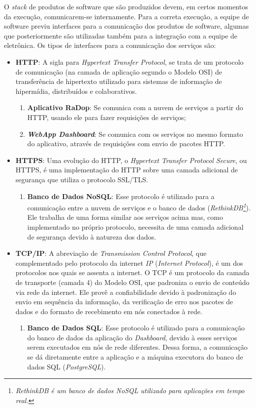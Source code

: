 O \textit{stack} de produtos de software que são produzidos devem, em certos momentos da execução, comunicarem-se internamente. Para a correta execução, a equipe de software previu interfaces para a comunicação dos produtos de software, algumas que posteriormente são utilizadas também para a integração com a equipe de eletrônica.
Os tipos de interfaces para a comunicação dos serviços são:
\begin{itemize}
    \item \textbf{HTTP}:
    A sigla para \textit{Hypertext Transfer Protocol}, se trata de um protocolo de comunicação (na camada de aplicação segundo o Modelo OSI) de transferência de hipertexto utilizado para sistemas de informação de hipermídia, distribuídos e colaborativos.
    \begin{enumerate}
        \item \textbf{Aplicativo RaDop}: Se comunica com a nuvem de serviços a partir do HTTP, usando ele para fazer requisições de serviços;
        \item \textbf{\textit{WebApp Dashboard}}: Se comunica com os serviços no mesmo formato do aplicativo, através de requisições com envio de pacotes HTTP.
    \end{enumerate}

    \item \textbf{HTTPS}:
    Uma evolução do HTTP, o \textit{Hypertext Transfer Protocol Secure}, ou HTTPS, é uma implementação do HTTP sobre uma camada adicional de segurança que utiliza o protocolo SSL/TLS.
    \begin{enumerate}
        \item \textbf{Banco de Dados NoSQL}: Esse protocolo é utilizado para a comunicação entre a nuvem de serviços e o banco de dados (\textit{RethinkDB\footnote{\textit{RethinkDB é um banco de dados \textit{NoSQL} utilizado para aplicações em tempo real.}}}). Ele trabalha de uma forma similar aos serviços acima mas, como implementado no próprio protocolo, necessita de uma camada adicional de segurança devido à natureza dos dados.
    \end{enumerate}

    \item \textbf{TCP/IP}:
    A abreviação de \textit{Transmission Control Protocol}, que complementado pelo protocolo da internet \textit{IP} (\textit{Internet Protocol}), é um dos protocolos nos quais se assenta a internet. O TCP é um protocolo da camada de transporte (camada 4) do Modelo OSI, que padroniza o envio de conteúdo via rede da internet. Ele provê a confiabilidade devido à padronização do envio em sequência da informação, da verificação de erro nos pacotes de dados e do formato de recebimento em nós conectados à rede.
    \begin{enumerate}
        \item \textbf{Banco de Dados SQL}: Esse protocolo é utilizado para a comunicação do banco de dados da aplicação do \textit{Dashboard}, devido à esses serviços serem executados em nós de rede diferentes. Dessa forma, a comunicação se dá diretamente entre a aplicação e a máquina executora do banco de dados SQL (\textit{PostgreSQL}).
    \end{enumerate}
\end{itemize}

